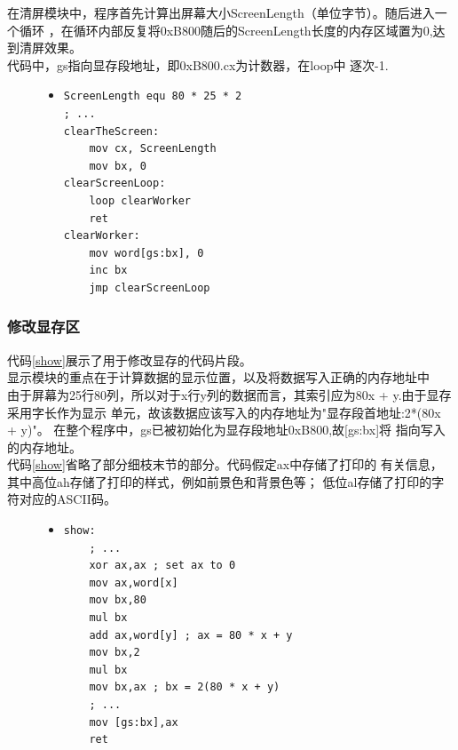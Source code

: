 \documentclass[a4paper]{article}
\newcommand{\codev}[1]{\textsf{#1}}
\begin{document}
在清屏模块中，程序首先计算出屏幕大小\codev{ScreenLength}（单位字节）。随后进入一个循环
，在循环内部反复将0xB800随后的\codev{ScreenLength}长度的内存区域置为0,达到清屏效果。\\

代码中，\codev{gs}指向显存段地址，即0xB800.\codev{cx}为计数器，在\codev{loop}中
逐次-1.
\begin{figure}
\begin{itemize}
\item[] \begin{lstlisting}[language={[x86masm]Assembler}, label=clearScreen, caption=清屏模块]
ScreenLength equ 80 * 25 * 2
; ...
clearTheScreen:
    mov cx, ScreenLength
    mov bx, 0
clearScreenLoop:
    loop clearWorker
    ret
clearWorker:
    mov word[gs:bx], 0
    inc bx
    jmp clearScreenLoop
\end{lstlisting}
\end{itemize}
\end{figure}

\subsubsection{修改显存区}
代码\ref{show}展示了用于修改显存的代码片段。\\

显示模块的重点在于计算数据的显示位置，以及将数据写入正确的内存地址中\\

由于屏幕为25行80列，所以对于x行y列的数据而言，其索引应为\codev{80x + y}.由于显存采用字长作为显示
单元，故该数据应该写入的内存地址为"显存段首地址:\codev{2*(80x + y)}"。
在整个程序中，\codev{gs}已被初始化为显存段地址0xB800,故\codev{[gs:bx]}将
指向写入的内存地址。\\

代码\ref{show}省略了部分细枝末节的部分。代码假定ax中存储了打印的
有关信息，其中高位\codev{ah}存储了打印的样式，例如前景色和背景色等；
低位\codev{al}存储了打印的字符对应的ASCII码。
\begin{figure}
\begin{itemize}
\item[] \begin{lstlisting}[language={[x86masm]Assembler}, label=show, caption=show模块]
show:
    ; ...
    xor ax,ax ; set ax to 0            
    mov ax,word[x]
    mov bx,80
    mul bx
    add ax,word[y] ; ax = 80 * x + y
    mov bx,2
    mul bx
    mov bx,ax ; bx = 2(80 * x + y)
    ; ...
    mov [gs:bx],ax 
    ret
\end{lstlisting}
\end{itemize}
\end{figure}
\end{document}

